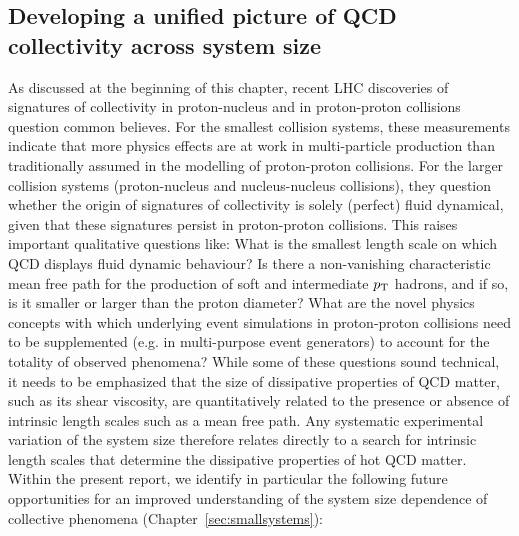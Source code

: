 \documentclass[../report.tex]{subfiles}
\begin{document}
\subsection{Developing a unified picture of QCD collectivity across system size}
As discussed at the beginning of this chapter, recent LHC discoveries of signatures of collectivity in proton-nucleus and in proton-proton collisions question common believes. For the smallest collision systems, these measurements indicate that more physics effects are at work in multi-particle production than traditionally assumed in the modelling of proton-proton collisions. For the larger collision systems (proton-nucleus and nucleus-nucleus collisions), they question whether the origin of signatures of collectivity is solely (perfect) fluid dynamical, given that these signatures persist in proton-proton collisions. This raises important qualitative questions like: What is the smallest length scale on which QCD displays fluid dynamic behaviour? Is there a non-vanishing characteristic mean free path for the production of soft and intermediate $p\sb{\scriptstyle\mathrm{T}}$ hadrons, and if so, is it smaller or larger than the proton diameter? What are the novel physics concepts with which underlying event simulations in proton-proton collisions need to be supplemented (e.g. in multi-purpose event generators) to account for the totality of observed phenomena?  While some of these questions sound technical, it needs to be emphasized that the size of dissipative properties of QCD matter, such as its shear viscosity, are quantitatively related to the presence or absence of intrinsic length scales such as a mean free path. Any systematic experimental variation of the system size therefore relates directly to a search for intrinsic length scales that determine the dissipative properties of hot QCD matter. Within the present report, we identify in particular the following future opportunities for an improved understanding of the system size dependence of collective phenomena (Chapter~\ref{sec:smallsystems}):
\end{document}

